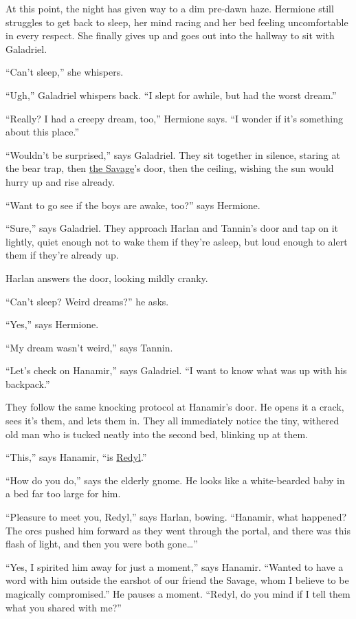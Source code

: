\documentclass[smalldemyvopaper,11pt,twoside,onecolumn,openright,extrafontsizes]{memoir}
\begin{document}
At this point, the night has given way to a dim pre-dawn haze. Hermione
still struggles to get back to sleep, her mind racing and her bed
feeling uncomfortable in every respect. She finally gives up and goes
out into the hallway to sit with Galadriel.

``Can't sleep,'' she whispers.

``Ugh,'' Galadriel whispers back. ``I slept for awhile, but had the
worst dream.''

``Really? I had a creepy dream, too,'' Hermione says. ``I wonder if it's
something about this place.''

``Wouldn't be surprised,'' says Galadriel. They sit together in silence,
staring at the bear trap, then \href{/characters/the-savage/}{the
Savage}'s door, then the ceiling, wishing the sun would hurry up and
rise already.

``Want to go see if the boys are awake, too?'' says Hermione.

``Sure,'' says Galadriel. They approach Harlan and Tannin's door and tap
on it lightly, quiet enough not to wake them if they're asleep, but loud
enough to alert them if they're already up.

Harlan answers the door, looking mildly cranky.

``Can't sleep? Weird dreams?'' he asks.

``Yes,'' says Hermione.

``My dream wasn't weird,'' says Tannin.

``Let's check on Hanamir,'' says Galadriel. ``I want to know what was up
with his backpack.''

They follow the same knocking protocol at Hanamir's door. He opens it a
crack, sees it's them, and lets them in. They all immediately notice the
tiny, withered old man who is tucked neatly into the second bed,
blinking up at them.

``This,'' says Hanamir, ``is \href{/characters/redyl/}{Redyl}.''

``How do you do,'' says the elderly gnome. He looks like a white-bearded
baby in a bed far too large for him.

``Pleasure to meet you, Redyl,'' says Harlan, bowing. ``Hanamir, what
happened? The orcs pushed him forward as they went through the portal,
and there was this flash of light, and then you were both gone\ldots{}''

``Yes, I spirited him away for just a moment,'' says Hanamir. ``Wanted
to have a word with him outside the earshot of our friend the Savage,
whom I believe to be magically compromised.'' He pauses a moment.
``Redyl, do you mind if I tell them what you shared with me?''
\end{document}
